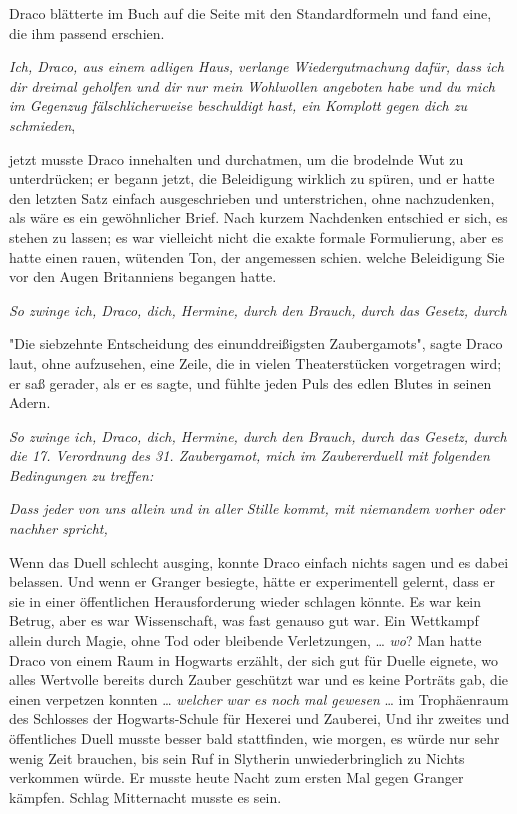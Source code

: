 {Draco blätterte im Buch auf die Seite mit den Standardformeln und fand eine, die ihm passend erschien.

\emph{Ich, Draco, aus einem adligen Haus, verlange Wiedergutmachung dafür, dass ich dir dreimal geholfen und dir nur mein Wohlwollen angeboten habe und du mich im Gegenzug fälschlicherweise beschuldigt hast, ein Komplott gegen dich zu schmieden},

jetzt musste Draco innehalten und durchatmen, um die brodelnde Wut zu unterdrücken; er begann jetzt, die Beleidigung wirklich zu spüren, und er hatte den letzten Satz einfach ausgeschrieben und unterstrichen, ohne nachzudenken, als wäre es ein gewöhnlicher Brief. Nach kurzem Nachdenken entschied er sich, es stehen zu lassen; es war vielleicht nicht die exakte formale Formulierung, aber es hatte einen rauen, wütenden Ton, der angemessen schien. welche Beleidigung Sie vor den Augen Britanniens begangen hatte.

\emph{So zwinge ich, Draco, dich, Hermine, durch den Brauch, durch das Gesetz, durch}

"Die siebzehnte Entscheidung des einunddreißigsten Zaubergamots", sagte Draco laut, ohne aufzusehen, eine Zeile, die in vielen Theaterstücken vorgetragen wird; er saß gerader, als er es sagte, und fühlte jeden Puls des edlen Blutes in seinen Adern.

\emph{So zwinge ich, Draco, dich, Hermine, durch den Brauch, durch das Gesetz, durch die 17. Verordnung des 31. Zaubergamot, mich im Zaubererduell mit folgenden Bedingungen zu treffen:}

\emph{Dass jeder von uns allein und in aller Stille kommt, mit niemandem vorher oder nachher spricht,}

Wenn das Duell schlecht ausging, konnte Draco einfach nichts sagen und es dabei belassen. Und wenn er Granger besiegte, hätte er experimentell gelernt, dass er sie in einer öffentlichen Herausforderung wieder schlagen könnte. Es war kein Betrug, aber es war Wissenschaft, was fast genauso gut war. Ein Wettkampf allein durch Magie, ohne Tod oder bleibende Verletzungen, … \emph{wo}? Man hatte Draco von einem Raum in Hogwarts erzählt, der sich gut für Duelle eignete, wo alles Wertvolle bereits durch Zauber geschützt war und es keine Porträts gab, die einen verpetzen konnten … \emph{welcher war es noch mal gewesen} … im Trophäenraum des Schlosses der Hogwarts-Schule für Hexerei und Zauberei, Und ihr zweites und öffentliches Duell musste besser bald stattfinden, wie morgen, es würde nur sehr wenig Zeit brauchen, bis sein Ruf in Slytherin unwiederbringlich zu Nichts verkommen würde. Er musste heute Nacht zum ersten Mal gegen Granger kämpfen. Schlag Mitternacht musste es sein.

}
